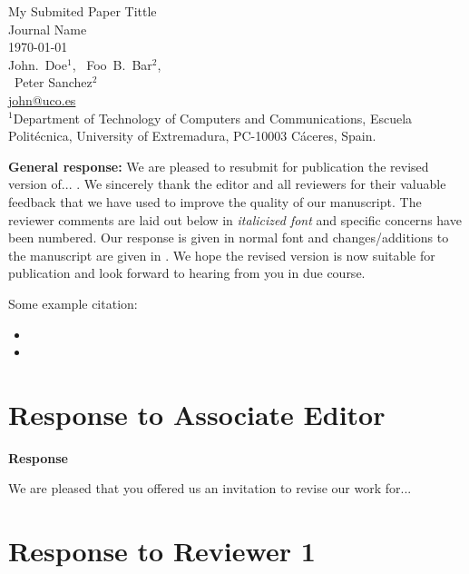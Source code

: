\documentclass[a4paper,twoside,11pt]{reviewresponse}
\makeatletter
\newcommand{\myAuthors}{{John.~Doe$^{\displaystyle 1}$, ~Foo~B.~Bar$^{\displaystyle 2}$, } \\ {~Peter Sanchez$^{\displaystyle 2}$}}
\newcommand{\myEmail}{john@uco.es}
\newcommand{\myTitle}{My Submited Paper Tittle}
\newcommand{\myJournal}{Journal Name}
\newcommand{\myDept}{{$^{\displaystyle 1}$Department of Technology of Computers and Communications, Escuela Polit\'ecnica, University of Extremadura, PC-10003 C\'aceres, Spain.}}
\makeatother
\begin{document}
\thispagestyle{plain}

\begin{center}
 {\LARGE\myTitle} \vspace{0.5cm} \\
 {\large\myJournal} \vspace{0.5cm} \\
 \today \vspace{0.5cm} \\
 \myAuthors \\
 \url{\myEmail} \vspace{1cm} \\
 \myDept
\end{center}

 \textbf{General response:} We are pleased to resubmit for publication the revised version of... . We sincerely thank the editor and all reviewers for their valuable feedback that we have used to improve the quality of our manuscript. The reviewer comments are laid out below in \textit{italicized font} and specific concerns have been numbered. Our response is given in normal font and changes/additions to the manuscript are given in . We hope the revised version is now suitable for publication and look forward to hearing from you in due course.

 Some example citation:
 \begin{itemize}
 	\item  {}
 	\item  {}
 \end{itemize}

\tableofcontents



\section{Response to Associate Editor}


\textbf{Response}

We are pleased that you offered us an invitation to revise our work for...

\section{Response to Reviewer 1}

\end{document}
